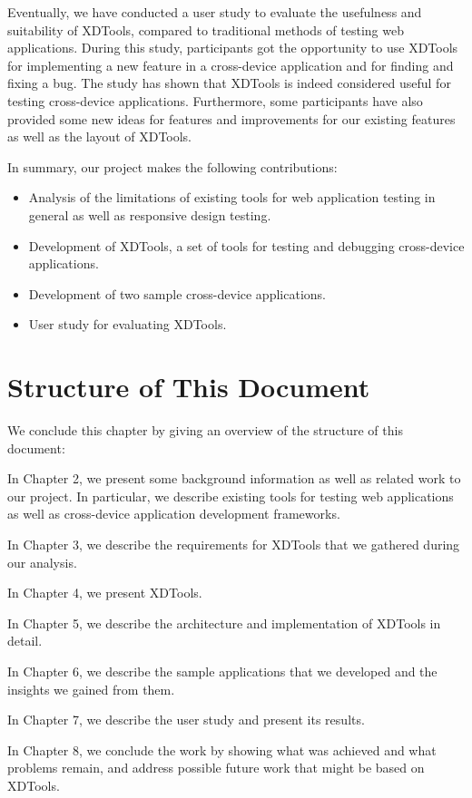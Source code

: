 Eventually, we have conducted a user study to evaluate the usefulness and suitability of XDTools, compared to traditional methods of testing web applications. During this study, participants got the opportunity to use XDTools for implementing a new feature in a cross-device application and for finding and fixing a bug. The study has shown that XDTools is indeed considered useful for testing cross-device applications. Furthermore, some participants have also provided some new ideas for features and improvements for our existing features as well as the layout of XDTools.

In summary, our project makes the following contributions:
\begin{itemize}
	\item Analysis of the limitations of existing tools for web application testing in general as well as responsive design testing.
	\item Development of XDTools, a set of tools for testing and debugging cross-device applications.
	\item Development of two sample cross-device applications.
	\item User study for evaluating XDTools.
\end{itemize}

\section{Structure of This Document}

We conclude this chapter by giving an overview of the structure of this document:

In Chapter 2, we present some background information as well as related work to our project. In particular, we describe existing tools for testing web applications as well as cross-device application development frameworks.

In Chapter 3, we describe the requirements for XDTools that we gathered during our analysis.

In Chapter 4, we present XDTools.

In Chapter 5, we describe the architecture and implementation of XDTools in detail.

In Chapter 6, we describe the sample applications that we developed and the insights we gained from them.

In Chapter 7, we describe the user study and present its results.

In Chapter 8, we conclude the work by showing what was achieved and what problems remain, and address possible future work that might be based on XDTools.